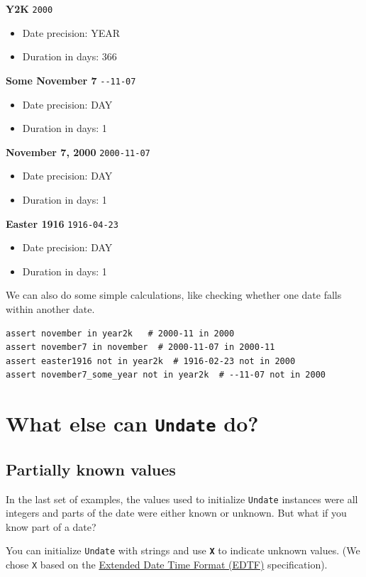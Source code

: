 \documentclass[final]{anthology-ch} %
\begin{document}
\noindent
\textbf{Y2K} \texttt{2000}
\begin{itemize}
    \item Date precision: YEAR
    \item Duration in days: 366
\end{itemize}

\noindent
\textbf{Some November 7} \texttt{-}\texttt{-11-07}
\begin{itemize}
   \item  Date precision: DAY
   \item Duration in days: 1
\end{itemize}

\noindent
\textbf{November 7, 2000} \texttt{2000-11-07}
\begin{itemize}
    \item Date precision: DAY
    \item Duration in days: 1
\end{itemize}

\noindent
\textbf{Easter 1916} \texttt{1916-04-23}
\begin{itemize}
    \item Date precision: DAY
    \item Duration in days: 1
\end{itemize}

We can also do some simple calculations, like checking whether one date falls within another date.
\begin{verbatim}
assert november in year2k   # 2000-11 in 2000
assert november7 in november  # 2000-11-07 in 2000-11
assert easter1916 not in year2k  # 1916-02-23 not in 2000
assert november7_some_year not in year2k  # --11-07 not in 2000
\end{verbatim}

\section{What else can \texttt{Undate} do?}

\subsection{Partially known values}

In the last set of examples, the values used to initialize \texttt{Undate} instances were all integers and parts of the date were either known or unknown. But what if you know part of a date?

You can initialize \texttt{Undate} with strings and use\textbf{ \texttt{X}} to indicate unknown values.  (We chose \texttt{X} based on the \href{https://www.loc.gov/standards/datetime/}{Extended Date Time Format (EDTF)} specification).
\end{document}
